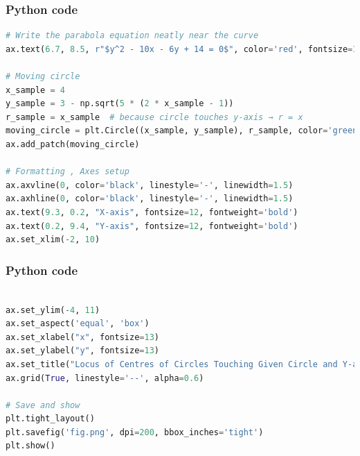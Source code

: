 \documentclass{beamer}
\begin{document}
\begin{frame}[fragile]
\frametitle{Python code}
    \begin{lstlisting}[language=Python]
# Write the parabola equation neatly near the curve
ax.text(6.7, 8.5, r"$y^2 - 10x - 6y + 14 = 0$", color='red', fontsize=13, fontweight='bold')

# Moving circle 
x_sample = 4
y_sample = 3 - np.sqrt(5 * (2 * x_sample - 1))
r_sample = x_sample  # because circle touches y-axis → r = x
moving_circle = plt.Circle((x_sample, y_sample), r_sample, color='green', fill=False, linewidth=2)
ax.add_patch(moving_circle)

# Formatting , Axes setup
ax.axvline(0, color='black', linestyle='-', linewidth=1.5)
ax.axhline(0, color='black', linestyle='-', linewidth=1.5)
ax.text(9.3, 0.2, "X-axis", fontsize=12, fontweight='bold')
ax.text(0.2, 9.4, "Y-axis", fontsize=12, fontweight='bold')
ax.set_xlim(-2, 10)
     \end{lstlisting}
\end{frame}
\begin{frame}[fragile]
\frametitle{Python code}
    \begin{lstlisting}[language=Python]

ax.set_ylim(-4, 11)
ax.set_aspect('equal', 'box')
ax.set_xlabel("x", fontsize=13)
ax.set_ylabel("y", fontsize=13)
ax.set_title("Locus of Centres of Circles Touching Given Circle and Y-axis", fontsize=14, fontweight='bold')
ax.grid(True, linestyle='--', alpha=0.6)

# Save and show
plt.tight_layout()
plt.savefig('fig.png', dpi=200, bbox_inches='tight')
plt.show()
       \end{lstlisting}
\end{frame}
\end{document}
